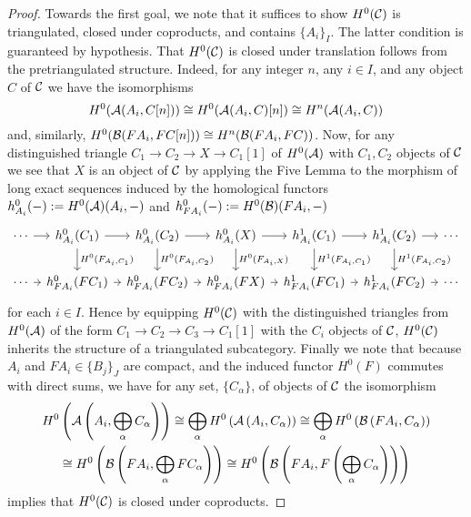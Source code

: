 \begin{proof}
  Towards the first goal, we note that it suffices to show \(H^0(\mathcal{C})\) is triangulated, closed under coproducts, and contains \(\{A_i\}_I\).
  The latter condition is guaranteed by hypothesis.
  That \(H^0(\mathcal{C})\) is closed under translation follows from the pretriangulated structure.  Indeed, for any integer \(n\), any \(i \in I\), and any object \(C\) of \(\mathcal{C}\) we have the isomorphisms
  \[H^0(\mathcal{A}(A_i, C[n])) \cong H^0(\mathcal{A}(A_i, C)[n]) \cong H^n(\mathcal{A}(A_i, C))\]
  and, similarly, \(H^0(\mathcal{B}(FA_i, FC[n])) \cong H^n(\mathcal{B}(FA_i, FC))\).
  Now, for any distinguished triangle \(C_1 \to C_2 \to X \to C_1[1]\) of \(H^0(\mathcal{A})\) with \(C_1, C_2\) objects of \(\mathcal{C}\) we see that \(X\) is an object of \(\mathcal{C}\) by applying the Five Lemma to the morphism of long exact sequences induced by the homological functors \(h^0_{A_i}(-) := H^0(\mathcal{A})(A_i, -)\) and \(h^0_{FA_i}(-) := H^0(\mathcal{B})(FA_i, -)\)
  \[\begin{tikzcd}[column sep=tiny]
  \cdots \arrow{r} & h^0_{A_i}(C_1) \arrow{r}\arrow{d}{H^0(F_{A_i,C_1})} & h^0_{A_i}(C_2) \arrow{r}\arrow{d}{H^0(F_{A_i,C_2})} & h^0_{A_i}(X) \arrow{r}\arrow{d}{H^0(F_{A_i,X})} & h^1_{A_i}(C_1) \arrow{r}\arrow{d}{H^1(F_{A_i, C_1})} & h^1_{A_i}(C_2) \arrow{r}\arrow{d}{H^1(F_{A_i,C_2})} & \cdots\\
  \cdots \arrow{r} & h^0_{FA_i}(FC_1) \arrow{r} & h^0_{FA_i}(FC_2) \arrow{r} & h^0_{FA_i}(FX) \arrow{r} & h^1_{FA_i}(FC_1) \arrow{r}& h^1_{FA_i}(FC_2)\arrow{r}&\cdots
  \end{tikzcd}\]
  for each \(i \in I\).
  Hence by equipping \(H^0(\mathcal{C})\) with the distinguished triangles from \(H^0(\mathcal{A})\) of the form \(C_1 \to C_2 \to C_3 \to C_1[1]\) with the \(C_i\) objects of \(\mathcal{C}\), \(H^0(\mathcal{C})\) inherits the structure of a triangulated subcategory.
  Finally we note that because \(A_i\) and \(FA_i \in \{B_j\}_J\) are compact, and the induced functor \(H^0(F)\) commutes with direct sums, we have for any set, \(\{C_\alpha\}\), of objects of \(\mathcal{C}\) the isomorphism
  \begin{gather*}
    H^0\left(\mathcal{A}\left(A_i, \bigoplus_\alpha C_\alpha\right)\right) \cong \bigoplus_\alpha H^0\left(\mathcal{A}\left(A_i, C_\alpha\right)\right) \cong \bigoplus_\alpha H^0\left(\mathcal{B}\left(FA_i, C_\alpha\right)\right)\\
    \cong H^0\left(\mathcal{B}\left(FA_i, \bigoplus_\alpha FC_\alpha\right)\right) \cong H^0\left(\mathcal{B}\left(FA_i, F\left(\bigoplus_\alpha C_\alpha\right)\right)\right)
  \end{gather*}
  implies that \(H^0(\mathcal{C})\) is closed under coproducts.


\end{proof}
